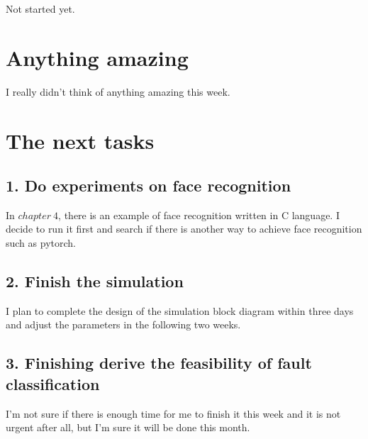 \documentclass[11pt,letterpaper]{article}
\begin{document}
Not started yet.

\section*{Anything amazing}

I really didn't think of anything amazing this week.

\section*{The next tasks}

\subsection*{1. Do experiments on face recognition}

In $chapter\ 4$, there is an example of face recognition written in C language. I decide to run it first and search if there is another way to achieve face recognition such as pytorch.

\subsection*{2. Finish the simulation}

I plan to complete the design of the simulation block diagram within three days and adjust the parameters in the following two weeks.

\subsection*{3. Finishing derive the feasibility of fault classification}

I'm not sure if there is enough time for me to finish it this week and it is not urgent after all, but I'm sure it will be done this month.
\end{document}
